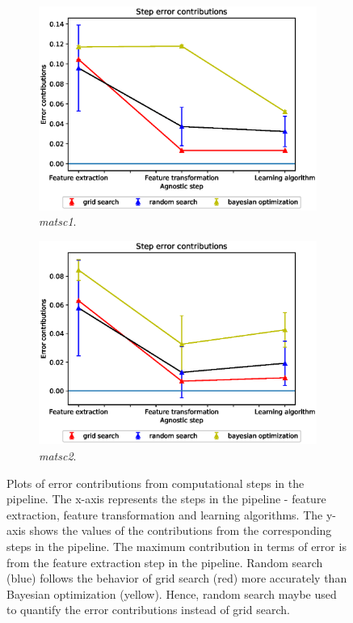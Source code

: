 \begin{figure}[ht!]
\begin{subfigure}{.5\textwidth}
  \includegraphics[scale=0.37]{img/EP/agnostic_error_steps_matsc_dataset1.eps}
  \caption{\textit{matsc1}.}
  \label{fig:eq_steps_matsc1}
\end{subfigure}%
\begin{subfigure}{.5\textwidth}
  \centering
  \includegraphics[scale=0.37]{img/EP/agnostic_error_steps_matsc_dataset2.eps}
  \caption{\textit{matsc2}.}
  \label{fig:eq_steps_matsc2}
\end{subfigure}
\caption{Plots of error contributions from computational steps in the pipeline. The x-axis represents the steps in the pipeline - feature extraction, feature transformation and learning algorithms. The y-axis shows the values of the contributions from the corresponding steps in the pipeline. The maximum contribution in terms of error is from the feature extraction step in the pipeline. Random search (blue) follows the behavior of grid search (red) more accurately than Bayesian optimization (yellow). Hence, random search maybe used to quantify the error contributions instead of grid search.}
\label{fig:eq_steps}
\end{figure}

